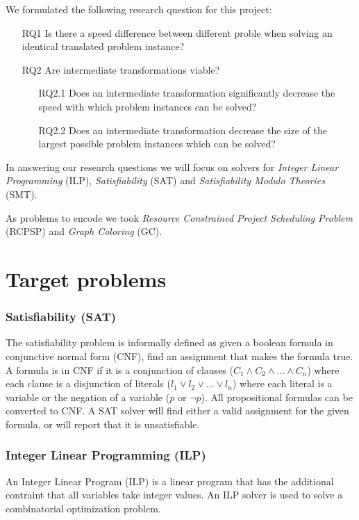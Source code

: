 \documentclass{sig-alternate}
\begin{document}
We formulated the following research question for this project:

\begin{enumerate}
\item[RQ1]{Is there a speed difference between different proble when solving an identical translated problem instance?}
\item[RQ2]{Are intermediate transformations viable?}
	\begin{enumerate}
	\item[RQ2.1]{Does an intermediate transformation significantly decrease the speed with which problem instances can be solved?}
	\item[RQ2.2]{Does an intermediate transformation decrease the size of the largest possible problem instances which can be solved?}
	\end{enumerate}
\end{enumerate}

In answering our research questions we will focus on solvers for \emph{Integer Linear Programming} (ILP), \emph{Satisfiability} (SAT) and \emph{Satisfiability Modulo Theories} (SMT).

As problems to encode we took \emph{Resource Constrained Project Scheduling Problem} (RCPSP) and \emph{Graph Coloring} (GC).

\section {Target problems}

\subsubsection*{Satisfiability (SAT)}

The satisfiability problem is informally defined as given a boolean formula in conjunctive normal form (CNF), find an assignment that makes the formula true. A formula is in CNF if it is a conjunction of clauses ($C_1 \wedge C_2 \wedge \ldots \wedge C_n$) where each clause is a disjunction of literals ($l_1 \lor l_2 \lor \ldots \lor l_n$) where each literal is a variable or the negation of a variable ($p$ or $\neg p$). All propositional formulas can be converted to CNF.
A SAT solver will find either a valid assignment for the given formula, or will report that it is unsatisfiable.

\subsubsection*{Integer Linear Programming (ILP)}
An Integer Linear Program (ILP) is a linear program that has the additional contraint that all variables take integer values. An ILP solver is used to solve a combinatorial optimization problem.
\end{document}

